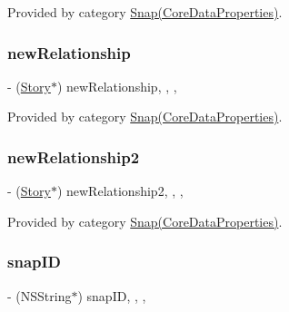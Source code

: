 Provided by category \hyperlink{category_snap_07_core_data_properties_08_a71a054402e878feacaed0d6e41c70b74}{Snap(\+Core\+Data\+Properties)}.

\hypertarget{interface_snap_a53885a2a1b43f35ae0585d1bd0dc1991}{}\label{interface_snap_a53885a2a1b43f35ae0585d1bd0dc1991} 
\subsubsection{\texorpdfstring{new\+Relationship}{newRelationship}}
{\footnotesize\ttfamily -\/ (\hyperlink{interface_story}{Story}$\ast$) new\+Relationship\hspace{0.3cm}{\ttfamily [read]}, {\ttfamily [write]}, {\ttfamily [nonatomic]}, {\ttfamily [retain]}}



Provided by category \hyperlink{category_snap_07_core_data_properties_08_a53885a2a1b43f35ae0585d1bd0dc1991}{Snap(\+Core\+Data\+Properties)}.

\hypertarget{interface_snap_a255d69bfefa15984bfb544521bed2178}{}\label{interface_snap_a255d69bfefa15984bfb544521bed2178} 
\subsubsection{\texorpdfstring{new\+Relationship2}{newRelationship2}}
{\footnotesize\ttfamily -\/ (\hyperlink{interface_story}{Story}$\ast$) new\+Relationship2\hspace{0.3cm}{\ttfamily [read]}, {\ttfamily [write]}, {\ttfamily [nonatomic]}, {\ttfamily [retain]}}



Provided by category \hyperlink{category_snap_07_core_data_properties_08_a255d69bfefa15984bfb544521bed2178}{Snap(\+Core\+Data\+Properties)}.

\hypertarget{interface_snap_ab9069d8e721ed8ce39c12b2591f99833}{}\label{interface_snap_ab9069d8e721ed8ce39c12b2591f99833} 
\subsubsection{\texorpdfstring{snap\+ID}{snapID}}
{\footnotesize\ttfamily -\/ (N\+S\+String$\ast$) snap\+ID\hspace{0.3cm}{\ttfamily [read]}, {\ttfamily [write]}, {\ttfamily [nonatomic]}, {\ttfamily [retain]}}



